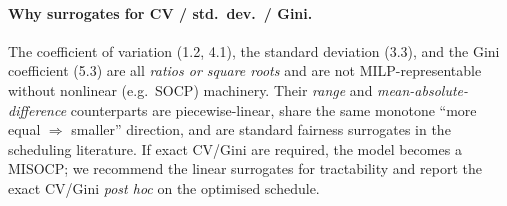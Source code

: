\documentclass[12pt, letterpaper]{article}
\begin{document}
\paragraph{Why surrogates for CV / std.\ dev.\ / Gini.}
The coefficient of variation (1.2, 4.1), the standard deviation (3.3),
and the Gini coefficient (5.3) are all \emph{ratios or square roots} and
are not MILP-representable without nonlinear (e.g.\ SOCP) machinery.
Their \emph{range} and \emph{mean-absolute-difference} counterparts are
piecewise-linear, share the same monotone ``more equal $\Rightarrow$
smaller'' direction, and are standard fairness surrogates in the
scheduling literature. If exact CV/Gini are required, the model becomes a
MISOCP; we recommend the linear surrogates for tractability and report
the exact CV/Gini \emph{post hoc} on the optimised schedule.
\end{document}
